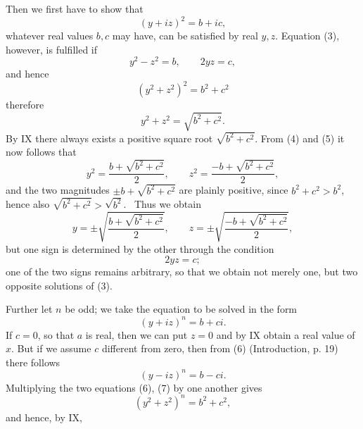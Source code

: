 
Then we first have to show that
\begin{equation}
 (y+iz)^2=b+ic,
\tag{3}
\end{equation}
whatever real values $b,c$ may have, can be satisfied by real $y,z$. Equation (3), however, is fulfilled if
\begin{equation}
 y^2-z^2=b,
\qquad 2yz=c,
\tag{4}
\end{equation}
and hence
\[
 (y^2+z^2)^2=b^2+c^2
\]
therefore
\begin{equation}
 y^2+z^2=\sqrt{b^2+c^2}.
\tag{5}
\end{equation}
By IX there always exists a positive square root $\sqrt{b^2+c^2}$. From (4) and (5) it now follows that
\[
 y^2=\frac{b+\sqrt{b^2+c^2}}{2},\qquad
 z^2=\frac{-b+\sqrt{b^2+c^2}}{2},
\]
and the two magnitudes $\pm b+\sqrt{b^2+c^2}$ are plainly positive, since $b^2+c^2>b^2$, hence also $\sqrt{b^2+c^2}>\sqrt{b^2}$.%
\ Thus we obtain
\[
 y=\pm\sqrt{\frac{b+\sqrt{b^2+c^2}}{2}},\qquad
 z=\pm\sqrt{\frac{-b+\sqrt{b^2+c^2}}{2}},
\]
but one sign is determined by the other through the condition
\[
 2yz=c;
\]
one of the two signs remains arbitrary, so that we obtain not merely one, but two opposite solutions of (3).

Further let $n$ be odd; we take the equation to be solved in the form
\begin{equation}
 (y+iz)^n=b+ci.
\tag{6}
\end{equation}
If $c=0$, so that $a$ is real, then we can put $z=0$ and by IX obtain a real value of $x$. But if we assume $c$ different from zero, then from (6) (Introduction, p. 19) there follows
\begin{equation}
 (y-iz)^n=b-ci.
\tag{7}
\end{equation}
Multiplying the two equations (6), (7) by one another gives
\[
 (y^2+z^2)^n=b^2+c^2,
\]
and hence, by IX,
